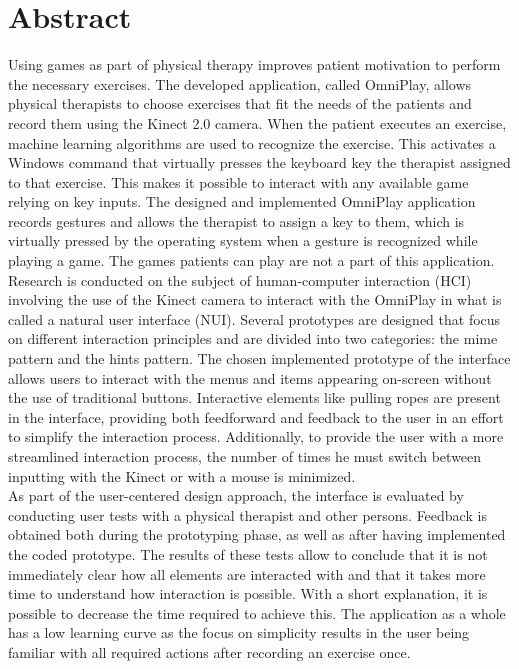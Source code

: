 \chapter*{Abstract}

Using games as part of physical therapy improves patient motivation to perform the necessary exercises. The developed application, called OmniPlay, allows physical therapists to choose exercises that fit the needs of the patients and record them using the Kinect 2.0 camera. When the patient executes an exercise, machine learning algorithms are used to recognize the exercise. This activates a Windows command that virtually presses the keyboard key the therapist assigned to that exercise. This makes it possible to interact with any available game relying on key inputs. The designed and implemented OmniPlay application records gestures and allows the therapist to assign a key to them, which is virtually pressed by the operating system when a gesture is recognized while playing a game. The games patients can play are not a part of this application.\\

Research is conducted on the subject of human-computer interaction (HCI) involving the use of the Kinect camera to interact with the OmniPlay in what is called a natural user interface (NUI). Several prototypes are designed that focus on different interaction principles and are divided into two categories: the mime pattern and the hints pattern. The chosen implemented prototype of the interface allows users to interact with the menus and items appearing on-screen without the use of traditional buttons. Interactive elements like pulling ropes are present in the interface, providing both feedforward and feedback to the user in an effort to simplify the interaction process. Additionally, to provide the user with a more streamlined interaction process, the number of times he must switch between inputting with the Kinect or with a mouse is minimized.\\

As part of the user-centered design approach, the interface is evaluated by conducting user tests with a physical therapist and other persons. Feedback is obtained both during the prototyping phase, as well as after having implemented the coded prototype. The results of these tests allow to conclude that it is not immediately clear how all elements are interacted with and that it takes more time to understand how interaction is possible. With a short explanation, it is possible to decrease the time required to achieve this. The application as a whole has a low learning curve as the focus on simplicity results in the user being familiar with all required actions after recording an exercise once.\\


